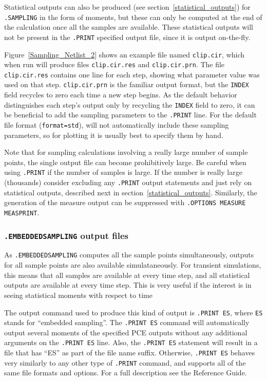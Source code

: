 Statistical outputs can also be produced (see section~\ref{statistical_outputs}) 
for \texttt{.SAMPLING} in the form of moments, but these can only be computed 
at the end of the calculation once all the samples are available.  These statistical outputs will not
be present in the \texttt{.PRINT} specified output file, since it is output on-the-fly.

Figure~\ref{Sampling_Netlist_2} shows an example file named \verb+clip.cir+, which when run will produce files
\verb+clip.cir.res+ and \verb+clip.cir.prn+.  The file \verb+clip.cir.res+
contains one line for each step, showing what parameter value was used
on that step.  \verb+clip.cir.prn+ is the familiar output format, but
the \verb+INDEX+ field recycles to zero each time a new step begins.
As the default behavior distinguishes each step's output only by recycling 
the \verb+INDEX+ field to zero, it can be beneficial to add the sampling
parameters to the \verb+.PRINT+ line.   For the default file format 
(\texttt{format=std}), \Xyce{} will not automatically include these sampling parameters,
so for plotting it is usually best to specify them by hand.


Note that for sampling calculations involving a really large number of sample 
points, the single output file can become prohibitively large.  Be careful when 
using \verb|.PRINT| if the number of samples is large.   If the number is really 
large (thousands) consider excluding any \verb|.PRINT| output statements and 
just rely on statistical outputs, described next in section~\ref{statistical_outputs}.
Similarly, the generation of the measure output can be suppressed with 
\texttt{.OPTIONS MEASURE MEASPRINT}.

\subsubsection{\texttt{.EMBEDDEDSAMPLING} output files}

As \texttt{.EMBEDDEDSAMPLING} computes all the sample points simultaneously, outputs for all 
sample points are also available simulataneously.  For transient simulations, this means that 
all samples are available at every time step, and all statistical outputs are available 
at every time step.  This is very useful if the interest is in seeing statistical moments 
with respect to time   

The output command used to produce this kind of output is \texttt{.PRINT ES}, where \texttt{ES} 
stands for  ``embedded sampling''.
The \texttt{.PRINT ES} command will automatically output several moments of the 
specified PCE outputs without any additional arguments on the \texttt{.PRINT ES} line.  
Also, the \texttt{.PRINT ES} statement will result in a file that has ``ES'' as part of the file name suffix.
Otherwise, \texttt{.PRINT ES} behaves very similarly to any other type of \texttt{.PRINT} 
command, and supports all of the same file formats and options.  For a full description see the
\Xyce{} Reference Guide.

